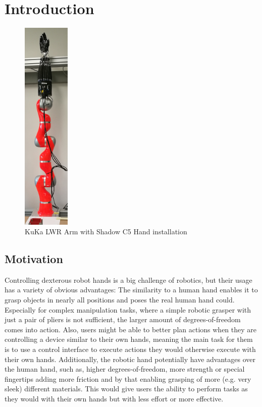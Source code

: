 \chapter{Introduction}

\begin{figure}
	\vspace{-2.1em}
	\caption{KuKa LWR Arm with Shadow C5 Hand installation\label{fig:armwithhand}}
	\includegraphics[width=0.2\textwidth]{assets/chpt_intro/lwr_c5hand.jpg}
\end{figure}

\section{Motivation}

Controlling dexterous robot hands is a big challenge of robotics, but their usage has a variety of obvious advantages: The similarity to a human hand enables it to grasp objects in nearly all positions and poses the real human hand could. Especially for complex manipulation tasks, where a simple robotic grasper with just a pair of pliers is not sufficient, the larger amount of degrees-of-freedom comes into action. Also, users might be able to better plan actions when they are controlling a device similar to their own hands, meaning the main task for them is to use a control interface to execute actions they would otherwise execute with their own hands. Additionally, the robotic hand potentially have advantages over the human hand, such as, higher degrees-of-freedom, more strength or special fingertips adding more friction and by that enabling grasping of more (e.g. very sleek) different materials. This would give users the ability to perform tasks as they would with their own hands but with less effort or more effective.

